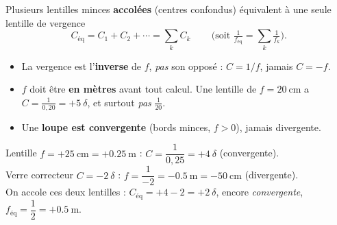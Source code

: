 \documentclass[11pt,a4paper]{article}
\begin{document}
\begin{cle}
Plusieurs lentilles minces \textbf{accolées} (centres confondus) équivalent à une seule lentille de
vergence
\[ \boxed{\,C_{\text{éq}}=C_1+C_2+\cdots=\sum_k C_k\,}\qquad
   \Big(\text{soit } \tfrac{1}{f_{\text{éq}}}=\textstyle\sum_k \tfrac{1}{f_k}\Big). \]
\end{cle}

\begin{piege}
\begin{itemize}[leftmargin=1.5em,topsep=2pt,itemsep=1pt]
  \item La vergence est l'\textbf{inverse} de $f$, \emph{pas} son opposé : $C=1/f$, jamais $C=-f$.
  \item $f$ doit être \textbf{en mètres} avant tout calcul. Une lentille de $f=\qty{20}{\cm}$ a
        $C=\tfrac{1}{0,20}=+5~\delta$, et surtout \emph{pas} $\tfrac{1}{20}$.
  \item Une \textbf{loupe est convergente} (bords minces, $f>0$), jamais divergente.
\end{itemize}
\end{piege}

\begin{exemplebox}[de $f$ à $C$ et retour]
Lentille $f=+\qty{25}{\cm}=+\qty{0.25}{\m}$ : $C=\dfrac{1}{0,25}=+4~\delta$ (convergente).\\
Verre correcteur $C=-2~\delta$ : $f=\dfrac{1}{-2}=-\qty{0.5}{\m}=-\qty{50}{\cm}$ (divergente).\\
On accole ces deux lentilles : $C_{\text{éq}}=+4-2=+2~\delta$, encore \emph{convergente},
$f_{\text{éq}}=\dfrac{1}{2}=+\qty{0.5}{\m}$.
\end{exemplebox}
\end{document}
